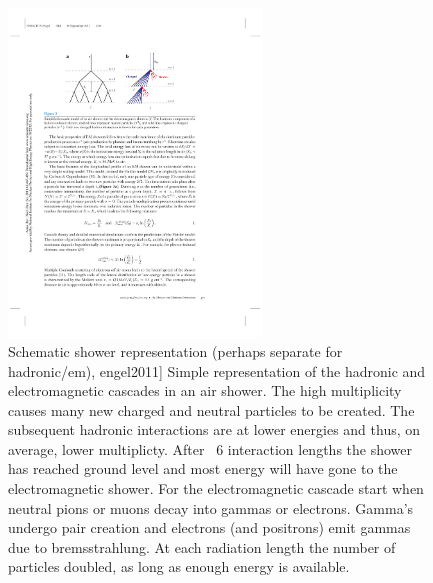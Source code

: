 \begin{figure}
    \centering
    \includegraphics[width=0.6\textwidth]
                    {plots/cosmic-rays/schematic_shower}
    \caption{Schematic shower representation (perhaps separate for hadronic/em), engel2011]
Simple representation of the hadronic and electromagnetic cascades in an air shower. The high multiplicity causes many new charged and neutral particles to be created. The subsequent hadronic interactions are at lower energies and thus, on average, lower multiplicty. After ~6 interaction lengths the shower has reached ground level and most energy will have gone to the electromagnetic shower. For the electromagnetic cascade start when neutral pions or muons decay into gammas or electrons. Gamma's undergo pair creation and electrons (and positrons) emit gammas due to bremsstrahlung. At each radiation length the number of particles doubled, as long as enough energy is available.}
    \label{fig:schematic_shower}
\end{figure}


